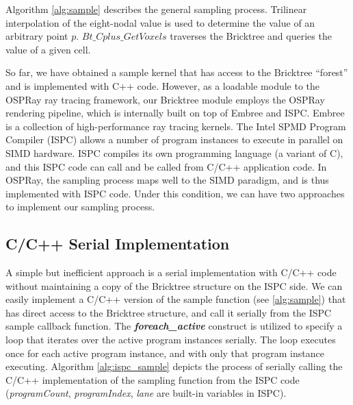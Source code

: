 Algorithm \ref{alg:sample} describes the general sampling process. 
Trilinear interpolation of the eight-nodal value is used to determine the value of an 
arbitrary point $p$. $Bt\_Cplus\_GetVoxels$ traverses the Bricktree and queries the 
value of a given cell. 

So far, we have obtained a sample kernel that has access to the Bricktree ``forest'' and is 
implemented with C++ code. However, as a loadable module to the OSPRay ray tracing
framework, our Bricktree module employs the OSPRay rendering pipeline, which is internally
built on top of Embree\cite{wald2014embree} and ISPC\cite{pharr2012ispc}. Embree is
a collection of high-performance ray tracing kernels. 
The Intel SPMD Program Compiler (ISPC) allows a number of program instances
to execute in parallel on SIMD hardware. ISPC compiles its own programming language
(a variant of C), and this ISPC code can call and be called from C/C++ application code.
In OSPRay, the sampling process maps well to the SIMD paradigm, and is thus implemented
with ISPC code. Under this condition, we can have two approaches to implement our
sampling process. 





\subsection{C/C++ Serial Implementation}

A simple but inefficient approach is a serial implementation with C/C++ code without
maintaining a copy of the Bricktree structure on the ISPC side. We can easily 
implement a C/C++ version of the sample function (see \cref{alg:sample}) that has direct
access to the Bricktree structure, and call it serially from the ISPC sample callback
function. The \textbf{\textit{foreach\_active}} construct is
utilized to specify a loop that iterates over the active program instances serially.
The loop executes once for each active program instance, and with only that program
instance executing. Algorithm \ref{alg:ispc_sample} depicts the process of serially calling 
the C/C++ implementation of the sampling function from the ISPC code (\textit{programCount},
\textit{programIndex}, \textit{lane} are built-in variables in ISPC). 

